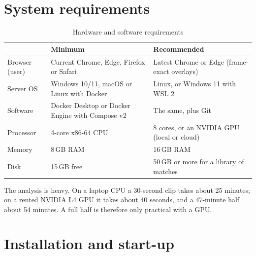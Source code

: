 \section{System requirements}

\begin{table}[H]
	\centering
	\begin{tabular}{|p{}|p{}|p{}|}
		\hline
		& \textbf{Minimum} & \textbf{Recommended} \\
		\hline
		Browser (user) & Current Chrome, Edge, Firefox or Safari & Latest Chrome or Edge (frame-exact overlays) \\
		\hline
		Server OS & Windows 10/11, macOS or Linux with Docker & Linux, or Windows 11 with WSL 2 \\
		\hline
		Software & Docker Desktop or Docker Engine with Compose v2 & The same, plus Git \\
		\hline
		Processor & 4-core x86-64 CPU & 8 cores, or an NVIDIA GPU (local or cloud) \\
		\hline
		Memory & 8\,GB RAM & 16\,GB RAM \\
		\hline
		Disk & 15\,GB free & 50\,GB or more for a library of matches \\
		\hline
	\end{tabular}
	\caption{Hardware and software requirements}
	\label{tab:requirements}
\end{table}

The analysis is heavy. On a laptop CPU a 30-second clip takes about 25 minutes; on a rented NVIDIA L4 GPU it takes about 40 seconds, and a 47-minute half about 54 minutes. A full half is therefore only practical with a GPU.

\section{Installation and start-up}
\label{sec:installation}

